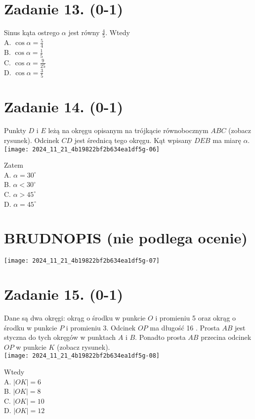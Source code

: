 \documentclass[10pt]{article}
\begin{document}
\section*{Zadanie 13. (0-1)}
Sinus kąta ostrego \(\alpha\) jest równy \(\frac{4}{5}\). Wtedy\\
A. \(\cos \alpha=\frac{5}{4}\)\\
B. \(\cos \alpha=\frac{1}{5}\)\\
C. \(\cos \alpha=\frac{9}{25}\)\\
D. \(\cos \alpha=\frac{3}{5}\)

\section*{Zadanie 14. (0-1)}
Punkty \(D\) i \(E\) leżą na okręgu opisanym na trójkącie równobocznym \(A B C\) (zobacz rysunek). Odcinek \(C D\) jest średnicą tego okręgu. Kąt wpisany \(D E B\) ma miarę \(\alpha\).\\
\texttt{[image: 2024\_11\_21\_4b19822bf2b634ea1df5g-06]}

Zatem\\
A. \(\alpha=30^{\circ}\)\\
B. \(\alpha<30^{\circ}\)\\
C. \(\alpha>45^{\circ}\)\\
D. \(\alpha=45^{\circ}\)

\section*{BRUDNOPIS (nie podlega ocenie)}
\begin{center}
\texttt{[image: 2024\_11\_21\_4b19822bf2b634ea1df5g-07]}
\end{center}

\section*{Zadanie 15. (0-1)}
Dane są dwa okręgi: okrąg o środku w punkcie \(O\) i promieniu 5 oraz okrąg o środku w punkcie \(P\) i promieniu 3. Odcinek \(O P\) ma długość 16 . Prosta \(A B\) jest styczna do tych okręgów w punktach \(A\) i \(B\). Ponadto prosta \(A B\) przecina odcinek \(O P\) w punkcie \(K\) (zobacz rysunek).\\
\texttt{[image: 2024\_11\_21\_4b19822bf2b634ea1df5g-08]}

Wtedy\\
A. \(|O K|=6\)\\
B. \(|O K|=8\)\\
C. \(|O K|=10\)\\
D. \(|O K|=12\)
\end{document}
